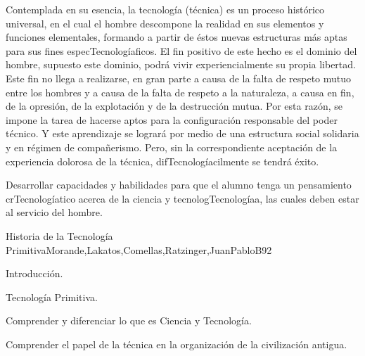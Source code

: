 \begin{syllabus}


\begin{justification}

Contemplada en su esencia, la tecnología (técnica) es un proceso histórico universal, en el cual el hombre descompone la realidad en sus elementos y funciones elementales, formando a partir de éstos nuevas estructuras más aptas para sus fines especTecnologíaficos.
El fin positivo de este hecho es el dominio del hombre,  supuesto este dominio, podrá vivir experiencialmente su propia libertad. Este fin no llega a realizarse, en gran parte a causa de la falta de respeto mutuo entre los hombres y a causa de la falta de respeto a la naturaleza, a causa en fin, de la opresión, de la explotación y de la destrucción mutua.
Por esta razón, se impone la tarea de hacerse aptos para la configuración responsable del poder técnico. Y este aprendizaje se logrará por medio de una estructura social solidaria y en régimen de compañerismo. Pero, sin la correspondiente aceptación de la experiencia dolorosa de la técnica, difTecnologíacilmente se tendrá éxito.
\end{justification}

\begin{goals}
\item Desarrollar capacidades y habilidades para que el alumno tenga un pensamiento crTecnologíatico acerca de  la ciencia y tecnologTecnologíaa, las cuales deben estar al servicio del hombre.
\end{goals}

\begin{outcomes}
\end{outcomes}

\begin{unit}{Historia de la Tecnología Primitiva}{Morande,Lakatos,Comellas,Ratzinger,JuanPabloB}{9}{2}
\begin{topics}
      \item Introducción.
      \item Tecnología Primitiva.
\end{topics}

\begin{learningoutcomes}
	\item Comprender y diferenciar lo que es Ciencia y Tecnología. 
 	\item Comprender el papel de la técnica en la organización de la civilización antigua.
\end{learningoutcomes}
\end{unit}


\end{syllabus}
